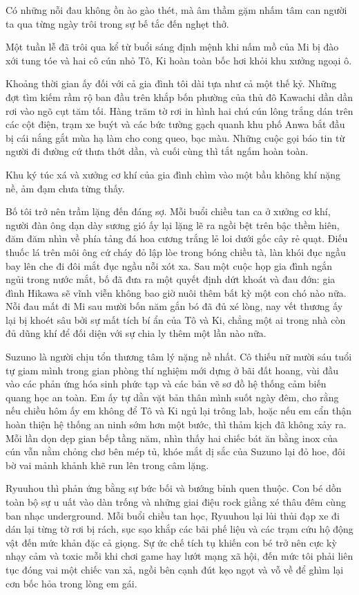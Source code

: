 \documentclass[../main.tex]{subfiles}
\begin{document}

Có những nỗi đau không ồn ào gào thét, mà âm thầm gặm nhấm tâm can người ta qua từng ngày trôi trong sự bế tắc đến nghẹt thở.

Một tuần lễ đã trôi qua kể từ buổi sáng định mệnh khi nấm mồ của Mi bị đào xới tung tóe và hai cô cún nhỏ Tô, Ki hoàn toàn bốc hơi khỏi khu xưởng ngoại ô.

Khoảng thời gian ấy đối với cả gia đình tôi dài tựa như cả một thế kỷ. Những đợt tìm kiếm rầm rộ ban đầu trên khắp bốn phường của thủ đô Kawachi dần dần rơi vào ngõ cụt tăm tối. Hàng trăm tờ rơi in hình hai chú cún lông trắng dán trên các cột điện, trạm xe buýt và các bức tường gạch quanh khu phố Anwa bắt đầu bị cái nắng gắt mùa hạ làm cho cong queo, bạc màu. Những cuộc gọi báo tin từ người đi đường cứ thưa thớt dần, và cuối cùng thì tắt ngấm hoàn toàn.

Khu ký túc xá và xưởng cơ khí của gia đình chìm vào một bầu không khí nặng nề, ảm đạm chưa từng thấy.

Bố tôi trở nên trầm lặng đến đáng sợ. Mỗi buổi chiều tan ca ở xưởng cơ khí, người đàn ông dạn dày sương gió ấy lại lặng lẽ ra ngồi bệt trên bậc thềm hiên, đăm đăm nhìn về phía tảng đá hoa cương trắng lẻ loi dưới gốc cây rẻ quạt. Điếu thuốc lá trên môi ông cứ cháy đỏ lập lòe trong bóng chiều tà, làn khói đục ngầu bay lên che đi đôi mắt đục ngầu nỗi xót xa. Sau một cuộc họp gia đình ngắn ngủi trong nước mắt, bố đã đưa ra một quyết định dứt khoát và đau đớn: gia đình Hikawa sẽ vĩnh viễn không bao giờ nuôi thêm bất kỳ một con chó nào nữa. Nỗi đau mất đi Mi sau mười bốn năm gắn bó đã đủ xé lòng, nay vết thương ấy lại bị khoét sâu bởi sự mất tích bí ẩn của Tô và Ki, chẳng một ai trong nhà còn đủ dũng khí để đối diện với sự chia ly thêm một lần nào nữa.

Suzuno là người chịu tổn thương tâm lý nặng nề nhất. Cô thiếu nữ mười sáu tuổi tự giam mình trong gian phòng thí nghiệm mới dựng ở bãi đất hoang, vùi đầu vào các phản ứng hóa sinh phức tạp và các bản vẽ sơ đồ hệ thống cảm biến quang học an toàn. Em ấy tự dằn vặt bản thân mình suốt ngày đêm, cho rằng nếu chiều hôm ấy em không để Tô và Ki ngủ lại trông lab, hoặc nếu em cẩn thận hoàn thiện hệ thống an ninh sớm hơn một bước, thì thảm kịch đã không xảy ra. Mỗi lần dọn dẹp gian bếp tầng năm, nhìn thấy hai chiếc bát ăn bằng inox của cún vẫn nằm chỏng chơ bên mép tủ, khóe mắt dị sắc của Suzuno lại đỏ hoe, đôi bờ vai mảnh khảnh khẽ run lên trong câm lặng.

Ryuuhou thì phản ứng bằng sự bức bối và bướng bỉnh quen thuộc. Con bé dồn toàn bộ sự u uất vào dàn trống và những giai điệu rock giằng xé thâu đêm cùng ban nhạc underground. Mỗi buổi chiều tan học, Ryuuhou lại lủi thủi đạp xe đi dán lại từng tờ rơi bị rách, sục sạo khắp các bãi phế liệu và các trạm cứu hộ động vật đến mức khản đặc cả giọng. Sự ức chế tích tụ khiến con bé trở nên cực kỳ nhạy cảm và toxic mỗi khi chơi game hay lướt mạng xã hội, đến mức tôi phải liên tục đóng vai một chiếc van xả, ngồi bên cạnh đút kẹo ngọt và vỗ về để ghìm lại cơn bốc hỏa trong lòng em gái.
\end{document}
